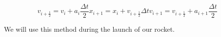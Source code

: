 \documentclass[reprint,english,notitlepage]{revtex4-2}
\begin{document}
\begin{subequations} \label{eq: leapfrog integration}
    \begin{equation}
        v_{i + \frac{1}{2}} = v_i + a_i \frac{Δt }{2}
    \end{equation}
    \begin{equation}
      x_{i+1} = x_{i} + v_{i + \frac{1}{2}} Δt 
    \end{equation}
    \begin{equation}
      v_{i+1} = v_{i + \frac{1}{2}} + a_{i+1} \frac{Δt }{2}
    \end{equation}
\end{subequations}

We will use this method during the launch of our rocket.
\end{document}
